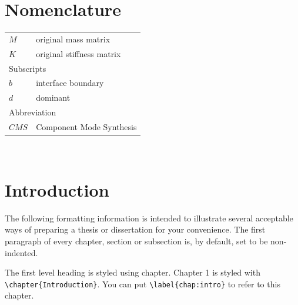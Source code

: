 \documentclass[11pt]{report}
\begin{document}
\listoftables
{}

\listoffigures
{}

\chapter*{Nomenclature}
\begin{tabular}{p{}p{}}
$M$	& original mass matrix\\
$K$	& original stiffness matrix\\[30pt]
\multicolumn{2}{l}{Subscripts}\\
$b$ & interface boundary\\
$d$ & dominant\\[30pt]
\multicolumn{2}{l}{Abbreviation}\\
$CMS$ & Component Mode Synthesis\\
\end{tabular}

\newpage 
~%

\chapter{Introduction}\label{chap:intro}
The following formatting information is intended to illustrate several acceptable ways of preparing a thesis or dissertation for your convenience.
The first paragraph of every chapter, section or subsection is, by default, set to be non-indented.

The first level heading is styled using chapter.
Chapter 1 is styled with\\ \verb|\chapter{Introduction}|.
You can put \verb|\label{chap:intro}| to refer to this chapter.
\end{document}
